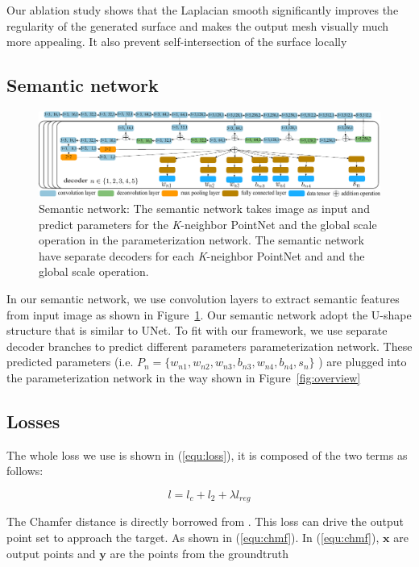 Our ablation study shows that the Laplacian smooth significantly improves the regularity of the generated surface and makes the output mesh visually much more appealing. It also prevent self-intersection of the surface locally
\subsection{Semantic network}
\label{subsec:semnet}

\begin{figure}[htbp]
	\centering
	\includegraphics[width=\linewidth]{img/net/semnet}
	\caption{Semantic network: The semantic network takes image as input and predict parameters for the \textit{K}-neighbor PointNet and the global scale operation in the parameterization network. The semantic network have separate decoders for each \textit{K}-neighbor PointNet and and the global scale operation.}
	\label{fig:semnet}
\end{figure}

In our semantic network, we use convolution layers to extract semantic features from input image as shown in Figure~\ref{fig:semnet}.  Our semantic network adopt the U-shape structure that is similar to UNet\citep{unet}. To fit with our framework, we use separate decoder branches to predict different parameters parameterization network. These predicted parameters (i.e. $P_n=\{w_{n1},w_{n2},w_{n3},b_{n3},w_{n4},b_{n4},s_{n}\}$ ) are plugged into the parameterization network in the way shown in Figure~\ref{fig:overview}

\subsection{Losses}
The whole loss we use is shown in (\ref{equ:loss}), it is composed of the two terms as follows:

\begin{equation}
\label{equ:loss}
l = l_c + l_2 + \lambda l_{reg} 
\end{equation}

 The Chamfer distance is directly borrowed from \citep{PSGN}. This loss can drive the output point set to approach the target. As shown in (\ref{equ:chmf}). In (\ref{equ:chmf}), $\mathbf{x}$ are output points and $\mathbf{y}$ are the points from the groundtruth

